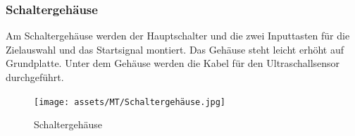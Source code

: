 \subsubsection{Schaltergehäuse}

Am Schaltergehäuse werden der Hauptschalter und die zwei Inputtasten für die Zielauswahl und das Startsignal montiert. Das Gehäuse steht leicht erhöht auf Grundplatte. Unter dem Gehäuse werden die Kabel für den Ultraschallsensor durchgeführt.



\begin{figure}[H]
\texttt{[image: assets/MT/Schaltergehäuse.jpg]}
\caption{Schaltergehäuse}
\label{fig:Schaltergehäuse}
\end{figure}

